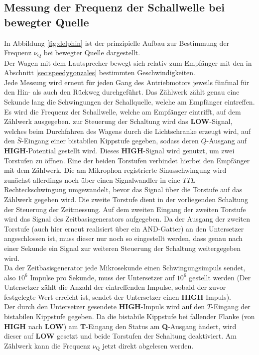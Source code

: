 \FloatBarrier
\subsection{Messung der Frequenz der Schallwelle bei bewegter Quelle}
\label{sec:frequenz}
In Abbildung \ref{fig:delphin} ist der prinzipielle Aufbau zur Bestimmung der Frequenz $\nu_{\mathrm{Q}}$ bei bewegter Quelle dargestellt.\\
Der Wagen mit dem Lautsprecher bewegt sich relativ zum Empfänger mit den in Abschnitt \ref{sec:speedygonzales} bestimmten Geschwindigkeiten.\\
Jede Messung wird erneut für jeden Gang des Antriebmotors jeweils fünfmal für den Hin- als auch den Rückweg durchgeführt.
Das Zählwerk zählt genau eine Sekunde lang die Schwingungen der Schallquelle, welche am Empfänger eintreffen. Es wird die Frequenz der Schallwelle, welche am Empfänger eintrifft, auf dem Zählwerk ausgegeben.
zur Steuerung der Schaltung wird das \textbf{LOW}-Signal, welches beim Durchfahren des Wagens durch die Lichtschranke erzeugt wird, auf den $\bar{S}$-Eingang einer bistabilen Kippstufe gegeben, sodass deren $Q$-Ausgang auf \textbf{HIGH}-Potential gestellt wird.
Dieses \textbf{HIGH}-Signal wird genutzt, um zwei Torstufen zu öffnen.
Eine der beiden Torstufen verbindet hierbei den Empfänger mit dem Zählwerk.
Die am Mikrophon registrierte Sinusschwingung wird zunächst allerdings noch über einen Signalwandler in eine $TTL$-Rechteckschwingung umgewandelt, bevor das Signal über die Torstufe auf das Zählwerk gegeben wird.
Die zweite Torstufe dient in der vorliegenden Schaltung der Steuerung der Zeitmessung.
Auf dem zweiten Eingang der zweiten Torstufe wird das Signal des Zeitbasisgenerators aufgegeben.
Da der Ausgang der zweiten Torstufe (auch hier erneut realisiert über ein AND-Gatter) an den Untersetzer angeschlossen ist, muss dieser nur noch so eingestellt werden, dass genau nach einer Sekunde ein Signal
zur weiteren Steuerung der Schaltung weitergegeben wird.\\
Da der Zeitbasisgenerator jede Mikrosekunde einen Schwingungsimpuls sendet, also $10^6$ Impulse pro Sekunde, muss der Untersetzer auf $10^6$ gestellt werden (Der Untersetzer zählt die Anzahl der eintreffenden Impulse, sobald der zuvor festgelegte Wert erreicht ist, sendet der Untersetzer einen \textbf{HIGH}-Impuls).\\
Der durch den Untersetzer gesendete \textbf{HIGH}-Impuls wird auf den $T$-Eingang der bistabilen Kippstufe gegeben. Da die bistabile Kippstufe bei fallender Flanke (von \textbf{HIGH} nach \textbf{LOW}) am \textbf{T}-Eingang den Status am \textbf{Q}-Ausgang ändert, wird dieser auf \textbf{LOW} gesetzt und beide Torstufen der Schaltung deaktiviert.
Am Zählwerk kann die Frequenz $\nu_{\mathrm{Q}}$ jetzt direkt abgelesen werden.

